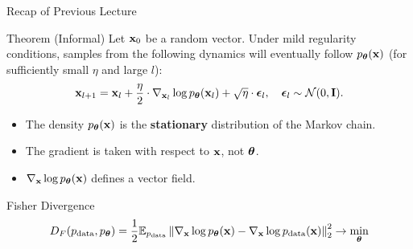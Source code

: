 \documentclass{beamer}
\begin{document}
\begin{frame}
	\titlepage
	\resetonslide	
\end{frame}
\begin{frame}{Recap of Previous Lecture}
	\vspace{-0.3cm}
	\begin{block}{Theorem (Informal)}
		Let $\mathbf{x}_0$ be a random vector. Under mild regularity conditions, samples from the following dynamics will eventually follow $p_{\boldsymbol{\theta}}(\mathbf{x})$ (for sufficiently small $\eta$ and large $l$):
		\vspace{-0.3cm}
		\[
			\mathbf{x}_{l + 1} = \mathbf{x}_l + \frac{\eta}{2} \cdot \nabla_{\mathbf{x}_l} \log p_{\boldsymbol{\theta}}(\mathbf{x}_l) + \sqrt{\eta} \cdot \boldsymbol{\epsilon}_l, \quad \boldsymbol{\epsilon}_l \sim \mathcal{N}(0, \mathbf{I}).
		\]
		\vspace{-0.5cm}
	\end{block}
	\vspace{-0.2cm}
	\begin{itemize}
		\item The density $p_{\boldsymbol{\theta}}(\mathbf{x})$ is the \textbf{stationary} distribution of the Markov chain.
		\item The gradient is taken with respect to $\mathbf{x}$, not $\boldsymbol{\theta}$.
		\item $\nabla_{\mathbf{x}} \log p_{\boldsymbol{\theta}}(\mathbf{x})$ defines a vector field.
	\end{itemize}
	\vspace{-0.3cm}
	\begin{block}{Fisher Divergence}
		\vspace{-0.7cm}
		\[
			D_F(p_{\text{data}}, p_{\boldsymbol{\theta}}) = \frac{1}{2}\mathbb{E}_{p_{\text{data}}}\left\| \nabla_{\mathbf{x}}\log p_{\boldsymbol{\theta}}(\mathbf{x}) - \nabla_{\mathbf{x}} \log p_{\text{data}}(\mathbf{x}) \right\|_2^2 \rightarrow \min_{\boldsymbol{\theta}}
		\]
		\vspace{-0.7cm}
	\end{block}
\end{frame}
\end{document}
